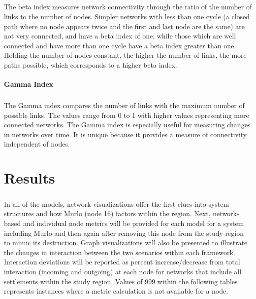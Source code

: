 \documentclass[12pt,a4paper]{thesis}
\begin{document}
\paragraph{}
The beta index measures network connectivity through the ratio of the number of links to the number of nodes. Simpler networks with less than one cycle (a closed path where no node appears twice and the first and last node are the same) are not very connected, and have a beta index of one, while those which are well connected and have more than one cycle have a beta index greater than one. Holding the number of nodes constant, the higher the number of links, the more paths possible, which corresponds to a higher beta index. 

\subsubsection{Gamma Index}
\paragraph{}
The Gamma index compares the number of links with the maximum number of possible links. The values range from 0 to 1 with higher values representing more connected networks. The Gamma index is especially useful for measuring changes in networks over time. It is unique because it provides a measure of connectivity independent of nodes.



\chapter{Results}
\paragraph{}	
In all of the models, network visualizations offer the first clues into system structures and how Murlo (node 16) factors within the region. Next, network-based and individual node metrics will be provided for each model for a system including Murlo and then again after removing this node from the study region to mimic its destruction. Graph visualizations will also be presented to illustrate the changes in interaction between the two scenarios within each framework. Interaction deviations will be reported as percent increase/decrease from total interaction (incoming and outgoing) at each node for networks that include all settlements within the study region. Values of $999$ within the following tables represents instances where a metric calculation is not available for a node.
\end{document}
